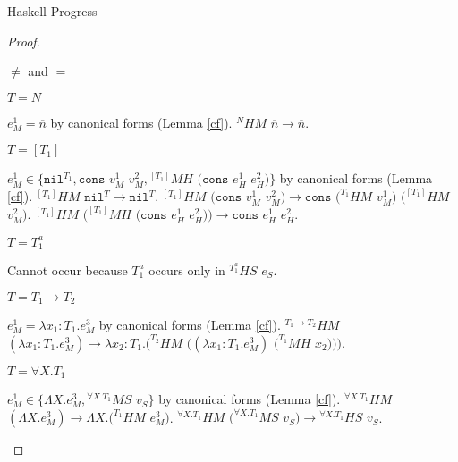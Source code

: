 \begin{theorem}{Haskell Progress}
\begin{proof}
\begin{case}{\pshm}
\begin{subcase}{\first{\vartyh} $\neq$ \tylump and \first{\vartym} $=$ \tylump}
\end{subcase}

\begin{subcase}{\tynum}



$T=N$

$e_{M}^{1}=\overline{n}$ by canonical forms (Lemma \ref{cf}).  $^{N}HM$ $\overline{n}\rightarrow\overline{n}$.

\end{subcase}

\begin{subcase}

$T=[T_{1}]$

$e_{M}^{1}\in\lbrace\mathtt{nil}^{T_{1}},\mathtt{cons}$ $v_{M}^{1}$ $v_{M}^{2},{^{[T_{1}]}M}H$ $(\mathtt{cons}$ $e_{H}^{1}$ $e_{H}^{2})\rbrace$ by canonical forms (Lemma \ref{cf}).  $^{[T_{1}]}HM$ $\mathtt{nil}^{T}\rightarrow\mathtt{nil}^{T}$.  $^{[T_{1}]}HM$ $(\mathtt{cons}$ $v_{M}^{1}$ $v_{M}^{2})\rightarrow\mathtt{cons}$ $(^{T_{1}}HM$ $v_{M}^{1})$ $(^{[T_{1}]}HM$ $v_{M}^{2})$.  $^{[T_{1}]}HM$ $(^{[T_{1}]}MH$ $(\mathtt{cons}$ $e_{H}^{1}$ $e_{H}^{2}))\rightarrow\mathtt{cons}$ $e_{H}^{1}$ $e_{H}^{2}$.

\end{subcase}

\begin{subcase}

$T=T_{1}^{a}$

Cannot occur because $T_{1}^{a}$ occurs only in $^{T_{1}^{a}}HS$ $e_{S}$.

\end{subcase}

\begin{subcase}

$T=T_{1}\rightarrow T_{2}$

$e_{M}^{1}=\lambda x_{1}:T_{1}.e_{M}^{3}$ by canonical forms (Lemma \ref{cf}).  $^{T_{1}\rightarrow T_{2}}HM$ $(\lambda x_{1}:T_{1}.e_{M}^{3})\rightarrow\lambda x_{2}:T_{1}.(^{T_{2}}HM$ $((\lambda x_{1}:T_{1}.e_{M}^{3})$ $(^{T_{1}}MH$ $x_{2})))$.

\end{subcase}

\begin{subcase}

$T=\forall X.T_{1}$

$e_{M}^{1}\in\lbrace\Lambda X.e_{M}^{3},{^{\forall X.T_{1}}M}S$ $v_{S}\rbrace$ by canonical forms (Lemma \ref{cf}).  $^{\forall X.T_{1}}HM$ $(\Lambda X.e_{M}^{3})\rightarrow\Lambda X.(^{T_{1}}HM$ $e_{M}^{3})$.  $^{\forall X.T_{1}}HM$ $(^{\forall X.T_{1}}MS$ $v_{S})\rightarrow{^{\forall X.T_{1}}H}S$ $v_{S}$.


\end{subcase}
\end{case}
\end{proof}
\end{theorem}
